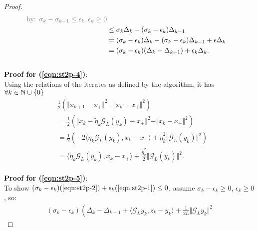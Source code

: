 \documentclass[12pt]{article}
\begin{document}
\begin{proof}
\begin{align*}
            \textcolor{gray}{
                \text{by: } \sigma_k - \sigma_{k - 1} \le \epsilon_k, \epsilon_k \ge 0
            }
            \\
            &\le 
            \sigma_k \Delta_k - (\sigma_k - \epsilon_k)\Delta_{k - 1}
            \\
            &= 
            (\sigma_k - \epsilon_k)\Delta_k - (\sigma_k - \epsilon_k)\Delta_{k - 1}
            + \epsilon \Delta_k 
            \\
            &= (\sigma_k - \epsilon_k)(\Delta_k - \Delta_{k - 1}) + \epsilon_k \Delta_k. 
        \end{align*}
        \\
        \textbf{Proof for (\ref*{eqn:st2p-4})}:
        \\
        Using the relations of the iterates as defined by the algorithm, it has $\forall k \in \mathbb N\cup \{0\}$
        \begin{align*}
            & \frac{1}{2} 
            \left(
                \Vert x_{k + 1} - x_+\Vert^2
                - 
                \Vert x_k - x_+\Vert^2 
            \right)
            \\
            &=
            \frac{1}{2} 
            \left(
                \Vert x_k - \tilde \eta_k\mathcal G_L (y_k) - x_+ \Vert^2 
                - 
                \Vert x_k - x_+\Vert^2
            \right)
            \\
            &= 
            \frac{1}{2}\left(
                -2\langle \tilde \eta_k \mathcal G_L(y_k), x_k - x_+\rangle
                + 
                \tilde \eta_k^2 \Vert \mathcal G_L(y_k)\Vert^2
            \right)
            \\
            &= 
            \langle \tilde \eta_k \mathcal G_L(y_k), x_k - x_+\rangle
                + 
            \frac{\tilde \eta_k^2}{2} \Vert \mathcal G_L(y_k)\Vert^2. 
        \end{align*}
        \\
        \textbf{Proof for (\ref*{eqn:st2p-5})}:
        \\
        To show $(\sigma_k - \epsilon_k)(\ref*{eqn:st2p-2}) + \epsilon_k(\ref*{eqn:st2p-1}) \le 0$, assume $\sigma_k - \epsilon_k \ge 0$, $\epsilon_k \ge 0$, so: 
        {\footnotesize
        \begin{align*}
            (\sigma_k - \epsilon_k)
            \left(
                \Delta_k - \Delta_{k - 1}
                + \langle \mathcal G_L y_k, z_k - y_k\rangle
                + \frac{1}{2L} \Vert \mathcal G_L y_k \Vert^2

\end{align*}}
\end{proof}
\end{document}
